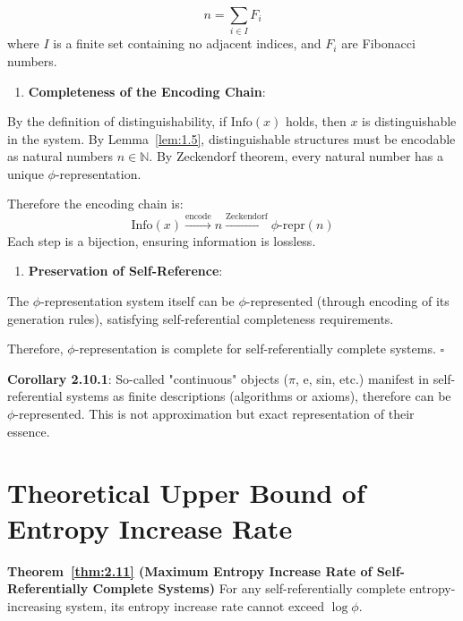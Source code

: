 \begin{equation}
n = \sum_{i \in I} F_i
\end{equation}
   where $I$ is a finite set containing no adjacent indices, and $F_i$ are Fibonacci numbers.

\begin{enumerate}
\item \textbf{Completeness of the Encoding Chain}:
\end{enumerate}
   By the definition of distinguishability, if $\text{Info}(x)$ holds, then $x$ is distinguishable in the system.
   By Lemma~\ref{lem:1.5}, distinguishable structures must be encodable as natural numbers $n \in \mathbb{N}$.
   By Zeckendorf theorem, every natural number has a unique $\phi$-representation.
   
   Therefore the encoding chain is:
\begin{equation}
\text{Info}(x) \xrightarrow{\text{encode}} n \xrightarrow{\text{Zeckendorf}} \phi\text{-repr}(n)
\end{equation}
   Each step is a bijection, ensuring information is lossless.

\begin{enumerate}
\item \textbf{Preservation of Self-Reference}:
\end{enumerate}
   The $\phi$-representation system itself can be $\phi$-represented (through encoding of its generation rules),
   satisfying self-referential completeness requirements.

Therefore, $\phi$-representation is complete for self-referentially complete systems. $\square$

\textbf{Corollary 2.10.1}:
\label{cor:2.10.1}
So-called "continuous" objects ($\pi$, e, sin, etc.) manifest in self-referential systems as finite descriptions (algorithms or axioms),
therefore can be $\phi$-represented. This is not approximation but exact representation of their essence.

\section{Theoretical Upper Bound of Entropy Increase Rate}
\label{sec:ch04_encoding:theoretical-upper-bound-of-entropy-increase-rate}

\textbf{Theorem~\ref{thm:2.11} (Maximum Entropy Increase Rate of Self-Referentially Complete Systems)}
\label{thm:2.11}
For any self-referentially complete entropy-increasing system, its entropy increase rate cannot exceed $\log \phi$.

